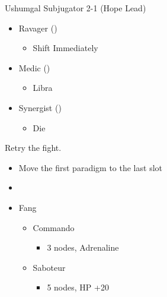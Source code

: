 \renewcommand{\first}{[1] Ravager (\rav)}
\renewcommand{\second}{[2] Medic (\med)}
\renewcommand{\third}{[3] Synergist (\syn)}
\newpage
\begin{multicols}{2}
\begin{battle}{Ushumgal Subjugator 2-1 (Hope Lead)}
\begin{itemize}
    \item \first
    \begin{itemize}
    \item Shift Immediately
    \end{itemize}
    \item \second
    \begin{itemize}
        \item Libra
    \end{itemize}
    \item \third
    \begin{itemize}
        \item Die
    \end{itemize}
\end{itemize}
\end{battle}
Retry the fight.
\begin{menu}
\begin{itemize}
    \paradigm
    \begin{itemize}
        \item Move the first paradigm to the last slot
        \item {}%
{\paradigmline{[\com]}{\com}{\rav}}
{\paradigmline{\com}{\rav}{(\rav)}}%
{\paradigmline[3]{\textit{(\sab)}}{\textit{(\rav)}}{\textit{\rav}}}%
{\paradigmline{\sen}{(\rav)}{(\rav)}}%
{\paradigmline{\sab}{(\rav)}{\syn}}%
{\paradigmline{\com}{\rav}{\rav}}
    \end{itemize}
    \crystarium
    \begin{itemize}
        \item Fang
        \begin{itemize}
            \item Commando
            \begin{itemize}
                \item 3 nodes, Adrenaline
            \end{itemize}
            \item Saboteur
            \begin{itemize}
                \item 5 nodes, HP +20
            \end{itemize}

\end{itemize}
\end{itemize}
\end{itemize}
\end{menu}
\end{multicols}
